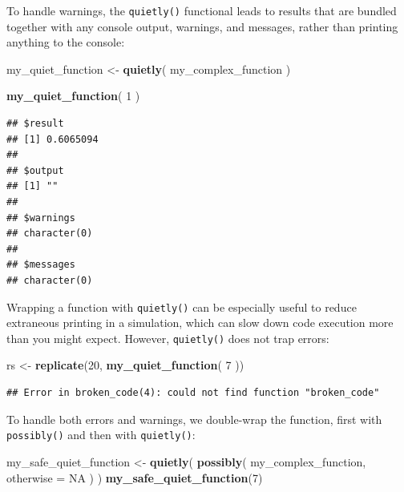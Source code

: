 \documentclass[
]{book}
\newenvironment{Shaded}{\begin{snugshade}}{\end{snugshade}}
\newcommand{\AttributeTok}[1]{\textcolor[rgb]{0.13,0.29,0.53}{#1}}
\newcommand{\ConstantTok}[1]{\textcolor[rgb]{0.56,0.35,0.01}{#1}}
\newcommand{\DecValTok}[1]{\textcolor[rgb]{0.00,0.00,0.81}{#1}}
\newcommand{\FunctionTok}[1]{\textcolor[rgb]{0.13,0.29,0.53}{\textbf{#1}}}
\newcommand{\NormalTok}[1]{#1}
\newcommand{\OtherTok}[1]{\textcolor[rgb]{0.56,0.35,0.01}{#1}}
\begin{document}
To handle warnings, the \texttt{quietly()} functional leads to results that are bundled together with any console output, warnings, and messages, rather than printing anything to the console:

\begin{Shaded}
\begin{Highlighting}[]
\NormalTok{my\_quiet\_function }\OtherTok{\textless{}{-}} \FunctionTok{quietly}\NormalTok{( my\_complex\_function )}

\FunctionTok{my\_quiet\_function}\NormalTok{( }\DecValTok{1}\NormalTok{ )}
\end{Highlighting}
\end{Shaded}

\begin{verbatim}
## $result
## [1] 0.6065094
## 
## $output
## [1] ""
## 
## $warnings
## character(0)
## 
## $messages
## character(0)
\end{verbatim}

Wrapping a function with \texttt{quietly()} can be especially useful to reduce extraneous printing in a simulation, which can slow down code execution more than you might expect.
However, \texttt{quietly()} does not trap errors:

\begin{Shaded}
\begin{Highlighting}[]
\NormalTok{rs }\OtherTok{\textless{}{-}} \FunctionTok{replicate}\NormalTok{(}\DecValTok{20}\NormalTok{, }\FunctionTok{my\_quiet\_function}\NormalTok{( }\DecValTok{7}\NormalTok{ ))}
\end{Highlighting}
\end{Shaded}

\begin{verbatim}
## Error in broken_code(4): could not find function "broken_code"
\end{verbatim}

To handle both errors and warnings, we double-wrap the function, first with \texttt{possibly()} and then with \texttt{quietly()}:

\begin{Shaded}
\begin{Highlighting}[]
\NormalTok{my\_safe\_quiet\_function }\OtherTok{\textless{}{-}} \FunctionTok{quietly}\NormalTok{( }\FunctionTok{possibly}\NormalTok{( my\_complex\_function, }\AttributeTok{otherwise =} \ConstantTok{NA}\NormalTok{ ) )}
\FunctionTok{my\_safe\_quiet\_function}\NormalTok{(}\DecValTok{7}\NormalTok{)}
\end{Highlighting}
\end{Shaded}
\end{document}
